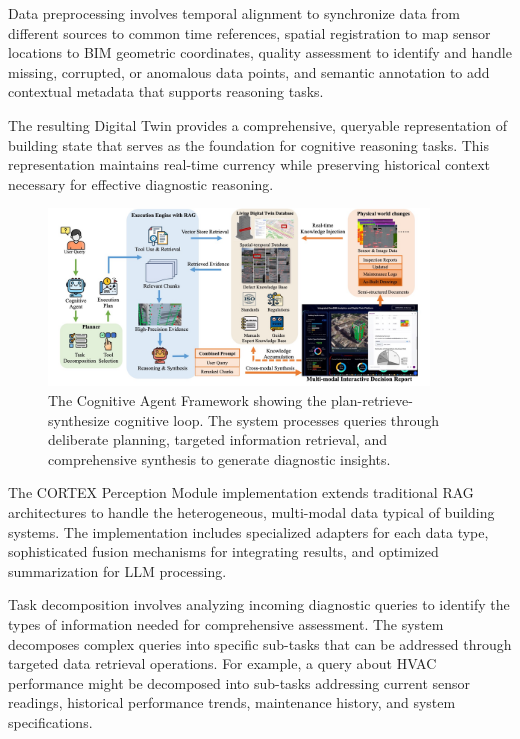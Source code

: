 Data preprocessing involves temporal alignment to synchronize data from different sources to common time references, spatial registration to map sensor locations to BIM geometric coordinates, quality assessment to identify and handle missing, corrupted, or anomalous data points, and semantic annotation to add contextual metadata that supports reasoning tasks.

The resulting Digital Twin provides a comprehensive, queryable representation of building state that serves as the foundation for cognitive reasoning tasks. This representation maintains real-time currency while preserving historical context necessary for effective diagnostic reasoning.

\begin{figure}[htbp]
\centering
\includegraphics[width=0.9\textwidth]{figures/DefectGPT/cognitive_agent_framework.png}

\caption{The Cognitive Agent Framework showing the plan-retrieve-synthesize cognitive loop. The system processes queries through deliberate planning, targeted information retrieval, and comprehensive synthesis to generate diagnostic insights.}
\label{fig:cognitive_agent_framework}
\end{figure}

The CORTEX Perception Module implementation extends traditional RAG architectures to handle the heterogeneous, multi-modal data typical of building systems. The implementation includes specialized adapters for each data type, sophisticated fusion mechanisms for integrating results, and optimized summarization for LLM processing.

Task decomposition involves analyzing incoming diagnostic queries to identify the types of information needed for comprehensive assessment. The system decomposes complex queries into specific sub-tasks that can be addressed through targeted data retrieval operations. For example, a query about HVAC performance might be decomposed into sub-tasks addressing current sensor readings, historical performance trends, maintenance history, and system specifications.


